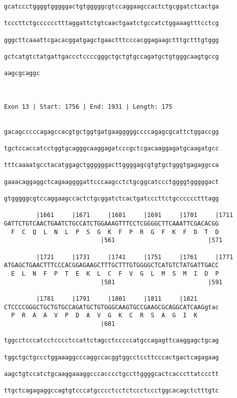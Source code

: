 \documentclass{article}
\begin{document}
\begin{Verbatim}
gcatccctggggtgggggactgtgggggcgtccaggaagccactctgcggatctcactga

tcccttctgcccccctttaggattctgtcaactgaatctgccatctggaaagtttcctcg

gggcttcaaattcgacacggatgagctgaactttcccacggagaagctttgctttgtggg

gctcatgtctatgattgaccctccccgggctgctgtgccagatgctgtgggcaagtgccg

aagcgcaggc
          

 
Exon 13 | Start: 1756 | End: 1931 | Length: 175


gacagcccccagagccacgtgctggtgatgaagggggccccagagcgcattctggaccgg

tgctccaccatcctggtgcagggcaaggagatcccgctcgacaaggagatgcaagatgcc

tttcaaaatgcctacatggagctggggggacttggggagcgtgtgctgggtgagaggcca

gaaacaggaggctcagaaggggattcccaagcctctgcggcatccctggggtgggggact

gtgggggcgtccaggaagccactctgcggatctcactgatcccttctgcccccctttagg

         |1661     |1671     |1681     |1691     |1701     |1711
GATTCTGTCAACTGAATCTGCCATCTGGAAAGTTTCCTCGGGGCTTCAAATTCGACACGG
  F  C  Q  L  N  L  P  S  G  K  F  P  R  G  F  K  F  D  T  D
                           |561                          |571
  
         |1721     |1731     |1741     |1751     |1761     |1771
ATGAGCTGAACTTTCCCACGGAGAAGCTTTGCTTTGTGGGGCTCATGTCTATGATTGACC
  E  L  N  F  P  T  E  K  L  C  F  V  G  L  M  S  M  I  D  P
                           |581                          |591
  
         |1781     |1791     |1801     |1811     |1821      
CTCCCCGGGCTGCTGTGCCAGATGCTGTGGGCAAGTGCCGAAGCGCAGGCATCAAGgtac
  P  R  A  A  V  P  D  A  V  G  K  C  R  S  A  G  I  K      
                           |601                           
  
tggcctcccatcctcccctccattctagcctcccccatgccagagttcaaggagctgcag
                                                            
tggctgctgccctggaaaggcccaggccacggtggcctccttcccactgactcagagaag
                                                            
aagctgtccatctgcaaggaaaggcccacccctgccttggggcactcacccttatccctt
                                                            
ttgctcagagaggccagtgtcccatgcccctcctctccctccctggcacagctctttgtc
                                                            

\end{Verbatim}
\end{document}
